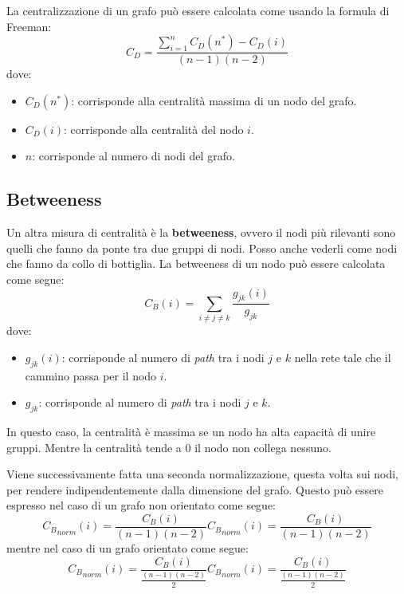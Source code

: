 La centralizzazione di un grafo può essere calcolata come usando la formula di Freeman:
\begin{equation}
    C_D = \frac{\sum_{i=1}^{n} C_D(n^\ast) - C_D(i)}{(n - 1)(n - 2)}
\end{equation}
dove:
\begin{itemize}
    \item $C_D(n^\ast)$: corrisponde alla centralità massima di un nodo del grafo.
    \item $C_D(i)$: corrisponde alla centralità del nodo $i$.
    \item $n$: corrisponde al numero di nodi del grafo.
\end{itemize}
\subsection{Betweeness}
Un altra misura di centralità è la \textbf{betweeness}, ovvero il nodi più
rilevanti sono quelli che fanno da ponte tra due gruppi di nodi. Posso anche
vederli come nodi che fanno da collo di bottiglia. La betweeness di un nodo
può essere calcolata come segue:
\begin{equation}
    C_B(i) = \sum_{i \neq j \neq k} \frac{g_{jk}(i)}{g_{jk}}
\end{equation}
dove:
\begin{itemize}
    \item $g_{jk}(i)$: corrisponde al numero di \textit{path} tra i
          nodi $j$ e $k$ nella rete tale che il cammino passa per il nodo $i$.
    \item $g_{jk}$: corrisponde al numero di \textit{path} tra i nodi
          $j$ e $k$.
\end{itemize}
In questo caso, la centralità è massima se un nodo ha alta capacità di unire
gruppi. Mentre la centralità tende a $0$ il nodo non collega nessuno.

Viene successivamente fatta una seconda normalizzazione, questa volta sui nodi,
per rendere indipendentemente dalla dimensione del grafo. Questo può essere
espresso nel caso di un grafo non orientato come segue:
\begin{equation}
    {C_B}_{norm}(i) = \frac{C_B(i)}{(n - 1)(n - 2)}
    {C_B}_{norm}(i) = \frac{C_B(i)}{(n - 1)(n - 2)}
\end{equation}
mentre nel caso di un grafo orientato come segue:
\begin{equation}
    {C_B}_{norm}(i) = \frac{C_B(i)}{\frac{(n - 1)(n - 2)}{2}}
    {C_B}_{norm}(i) = \frac{C_B(i)}{\frac{(n - 1)(n - 2)}{2}}
\end{equation}

